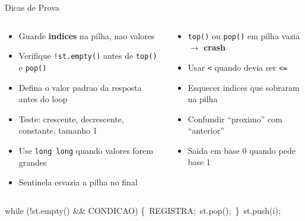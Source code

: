 \documentclass[aspectratio=169,11pt]{beamer}
\begin{document}
\begin{frame}[shrink=5]{Dicas de Prova}
  \begin{columns}[t]
      \begin{tcolorbox}[caixaVerde,title={Boas Praticas}]
        \begin{itemize}\small
          \item Guarde \textbf{indices} na pilha, nao valores
          \item Verifique \texttt{!st.empty()} antes de \texttt{top()} e \texttt{pop()}
          \item Defina o valor padrao da resposta antes do loop
          \item Teste: crescente, decrescente, constante, tamanho 1
          \item Use \texttt{long long} quando valores forem grandes
          \item Sentinela esvazia a pilha no final
        \end{itemize}
      \end{tcolorbox}
      \begin{tcolorbox}[caixaVermelho,title={Erros Frequentes}]
        \begin{itemize}\small
          \item \texttt{top()} ou \texttt{pop()} em pilha vazia $\to$ \textbf{crash}
          \item Usar \texttt{<} quando devia ser \texttt{<=}
          \item Esquecer indices que sobraram na pilha
          \item Confundir ``proximo'' com ``anterior''
          \item Saida em base 0 quando pede base 1
        \end{itemize}
      \end{tcolorbox}
  \end{columns}
  \vspace{0.12cm}
  \begin{tcolorbox}[caixaAzul,title={Template Mental --- decore este padrao}]
    \centering\ttfamily\small
    while (!st.empty() \&\& CONDICAO) \{\ REGISTRA;\ st.pop();\ \}\ st.push(i);
  \end{tcolorbox}
\end{frame}
\end{document}
